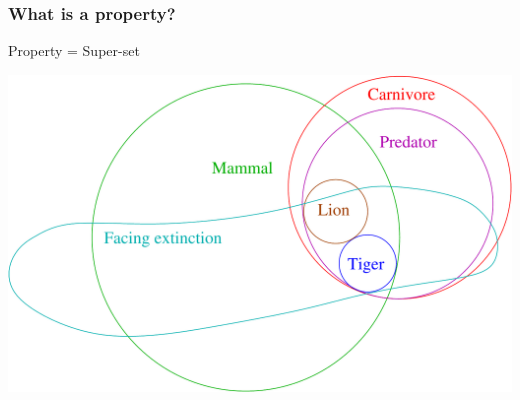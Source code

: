 \documentclass{beamer}
\begin{document}
\frame
{
  \frametitle{What is a property?}

  \begin{center}
      Property = Super-set

      \includegraphics[scale=0.35]{property_superset.pdf}
  
  \end{center}


}
\end{document}
